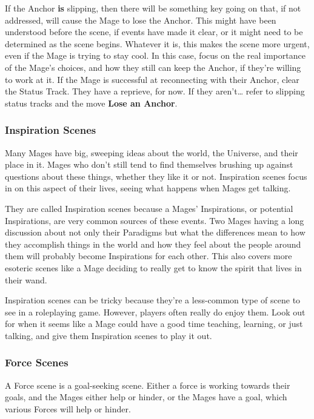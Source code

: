\documentclass[
  oneside,
  statementpaper,
  9pt]{memoir}
\begin{document}
If the Anchor \textbf{is} slipping, then there will be something key
going on that, if not addressed, will cause the Mage to lose the Anchor.
This might have been understood before the scene, if events have made it
clear, or it might need to be determined as the scene begins. Whatever
it is, this makes the scene more urgent, even if the Mage is trying to
stay cool. In this case, focus on the real importance of the Mage's
choices, and how they still can keep the Anchor, if they're willing to
work at it. If the Mage is successful at reconnecting with their Anchor,
clear the Status Track. They have a reprieve, for now. If they
aren't\ldots{} refer to slipping status tracks and the move \textbf{Lose
an Anchor}.

\hypertarget{inspiration-scenes}{%
\subsubsection{Inspiration Scenes}\label{inspiration-scenes}}

Many Mages have big, sweeping ideas about the world, the Universe, and
their place in it. Mages who don't still tend to find themselves
brushing up against questions about these things, whether they like it
or not. Inspiration scenes focus in on this aspect of their lives,
seeing what happens when Mages get talking.

They are called Inspiration scenes because a Mages' Inspirations, or
potential Inspirations, are very common sources of these events. Two
Mages having a long discussion about not only their Paradigms but what
the differences mean to how they accomplish things in the world and how
they feel about the people around them will probably become Inspirations
for each other. This also covers more esoteric scenes like a Mage
deciding to really get to know the spirit that lives in their wand.

Inspiration scenes can be tricky because they're a less-common type of
scene to see in a roleplaying game. However, players often really do
enjoy them. Look out for when it seems like a Mage could have a good
time teaching, learning, or just talking, and give them Inspiration
scenes to play it out.

\hypertarget{force-scenes}{%
\subsubsection{Force Scenes}\label{force-scenes}}

A Force scene is a goal-seeking scene. Either a force is working towards
their goals, and the Mages either help or hinder, or the Mages have a
goal, which various Forces will help or hinder.
\end{document}
